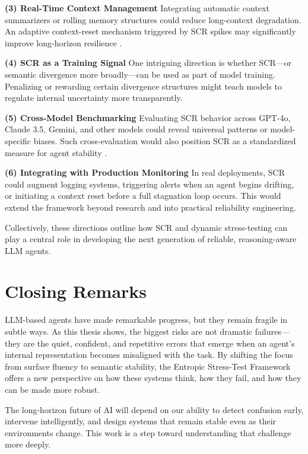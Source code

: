 \documentclass[12pt,a4paper]{report}
\begin{document}
\textbf{(3) Real-Time Context Management}
Integrating automatic context summarizers or rolling memory structures could reduce long-context degradation. An adaptive context-reset mechanism triggered by SCR spikes may significantly improve long-horizon resilience \cite{Wang2025ComplexityTrap, Zhou2025MemTool, Guo2024MOSS}.

\textbf{(4) SCR as a Training Signal}
One intriguing direction is whether SCR—or semantic divergence more broadly—can be used as part of model training. Penalizing or rewarding certain divergence structures might teach models to regulate internal uncertainty more transparently.

\textbf{(5) Cross-Model Benchmarking}
Evaluating SCR behavior across GPT-4o, Claude 3.5, Gemini, and other models could reveal universal patterns or model-specific biases. Such cross-evaluation would also position SCR as a standardized measure for agent stability \cite{Fu2024Tau, Grattafiori2025MCPMark}.

\textbf{(6) Integrating with Production Monitoring}
In real deployments, SCR could augment logging systems, triggering alerts when an agent begins drifting, or initiating a context reset before a full stagnation loop occurs. This would extend the framework beyond research and into practical reliability engineering.

Collectively, these directions outline how SCR and dynamic stress-testing can play a central role in developing the next generation of reliable, reasoning-aware LLM agents.

\section{Closing Remarks}
LLM-based agents have made remarkable progress, but they remain fragile in subtle ways. As this thesis shows, the biggest risks are not dramatic failures—they are the quiet, confident, and repetitive errors that emerge when an agent’s internal representation becomes misaligned with the task. By shifting the focus from surface fluency to semantic stability, the Entropic Stress-Test Framework offers a new perspective on how these systems think, how they fail, and how they can be made more robust.

The long-horizon future of AI will depend on our ability to detect confusion early, intervene intelligently, and design systems that remain stable even as their environments change. This work is a step toward understanding that challenge more deeply.
\end{document}
